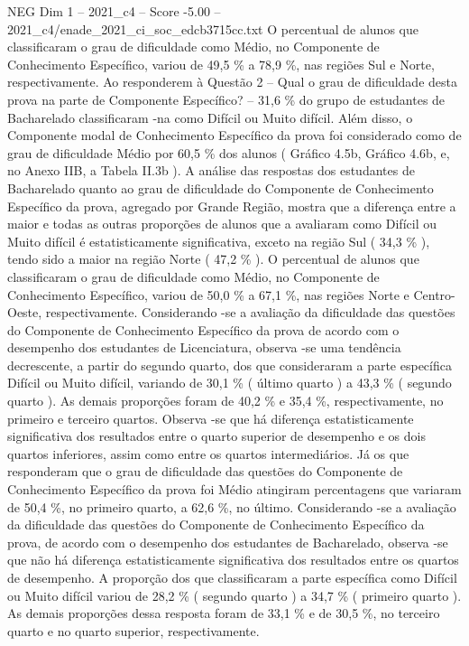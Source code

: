 \begin{textsample}{NEG Dim 1 – 2021\_c4 – Score -5.00 – 2021\_c4/enade\_2021\_ci\_soc\_edcb3715cc.txt}
O percentual de alunos que classificaram o grau de dificuldade como Médio, no Componente de Conhecimento Específico, variou de 49,5 \% a 78,9 \%, nas regiões Sul e Norte, respectivamente.
Ao responderem à Questão 2 – Qual o grau de dificuldade desta prova na parte de Componente Específico? – 31,6 \% do grupo de estudantes de Bacharelado classificaram -na como Difícil ou Muito difícil.
Além disso, o Componente modal de Conhecimento Específico da prova foi considerado como de grau de dificuldade Médio por 60,5 \% dos alunos ( Gráfico 4.5b, Gráfico 4.6b, e, no Anexo IIB, a Tabela II.3b ).
A análise das respostas dos estudantes de Bacharelado quanto ao grau de dificuldade do Componente de Conhecimento Específico da prova, agregado por Grande Região, mostra que a diferença entre a maior e todas as outras proporções de alunos que a avaliaram como Difícil ou Muito difícil é estatisticamente significativa, exceto na região Sul ( 34,3 \% ), tendo sido a maior na região Norte ( 47,2 \% ).
O percentual de alunos que classificaram o grau de dificuldade como Médio, no Componente de Conhecimento Específico, variou de 50,0 \% a 67,1 \%, nas regiões Norte e Centro-Oeste, respectivamente.
Considerando -se a avaliação da dificuldade das questões do Componente de Conhecimento Específico da prova de acordo com o desempenho dos estudantes de Licenciatura, observa -se uma tendência decrescente, a partir do segundo quarto, dos que consideraram a parte específica Difícil ou Muito difícil, variando de 30,1 \% ( último quarto ) a 43,3 \% ( segundo quarto ).
As demais proporções foram de 40,2 \% e 35,4 \%, respectivamente, no primeiro e terceiro quartos.
Observa -se que há diferença estatisticamente significativa dos resultados entre o quarto superior de desempenho e os dois quartos inferiores, assim como entre os quartos intermediários.
Já os que responderam que o grau de dificuldade das questões do Componente de Conhecimento Específico da prova foi Médio atingiram percentagens que variaram de 50,4 \%, no primeiro quarto, a 62,6 \%, no último.
Considerando -se a avaliação da dificuldade das questões do Componente de Conhecimento Específico da prova, de acordo com o desempenho dos estudantes de Bacharelado, observa -se que não há diferença estatisticamente significativa dos resultados entre os quartos de desempenho.
A proporção dos que classificaram a parte específica como Difícil ou Muito difícil variou de 28,2 \% ( segundo quarto ) a 34,7 \% ( primeiro quarto ).
As demais proporções dessa resposta foram de 33,1 \% e de 30,5 \%, no terceiro quarto e no quarto superior, respectivamente.

\end{textsample}

